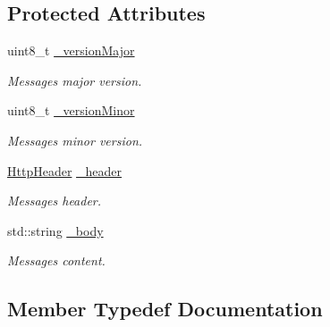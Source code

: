 \subsection*{Protected Attributes}
\begin{DoxyCompactItemize}
\item 
\mbox{\label{classHttp_1_1HttpMessage_a7ebf9e2ecb41f28cde2a222652d79b6b}} 
uint8\+\_\+t \mbox{\hyperlink{classHttp_1_1HttpMessage_a7ebf9e2ecb41f28cde2a222652d79b6b}{\+\_\+version\+Major}}
\begin{DoxyCompactList}\small\item\em Message\textquotesingle{}s major version. \end{DoxyCompactList}\item 
\mbox{\label{classHttp_1_1HttpMessage_acba06112337ed1daf60295a33d294de7}} 
uint8\+\_\+t \mbox{\hyperlink{classHttp_1_1HttpMessage_acba06112337ed1daf60295a33d294de7}{\+\_\+version\+Minor}}
\begin{DoxyCompactList}\small\item\em Message\textquotesingle{}s minor version. \end{DoxyCompactList}\item 
\mbox{\label{classHttp_1_1HttpMessage_a9d0afda82cc1a29af86228293cb4165c}} 
\mbox{\hyperlink{classHttp_1_1HttpMessage_a48fdadff82b4d5d227480a43166d008f}{Http\+Header}} \mbox{\hyperlink{classHttp_1_1HttpMessage_a9d0afda82cc1a29af86228293cb4165c}{\+\_\+header}}
\begin{DoxyCompactList}\small\item\em Message\textquotesingle{}s header. \end{DoxyCompactList}\item 
\mbox{\label{classHttp_1_1HttpMessage_a6f7948458c3d0df56a3944bd5225ed39}} 
std\+::string \mbox{\hyperlink{classHttp_1_1HttpMessage_a6f7948458c3d0df56a3944bd5225ed39}{\+\_\+body}}
\begin{DoxyCompactList}\small\item\em Message\textquotesingle{}s content. \end{DoxyCompactList}\end{DoxyCompactItemize}


\subsection{Member Typedef Documentation}
\mbox{\label{classHttp_1_1HttpMessage_a48fdadff82b4d5d227480a43166d008f}} 
